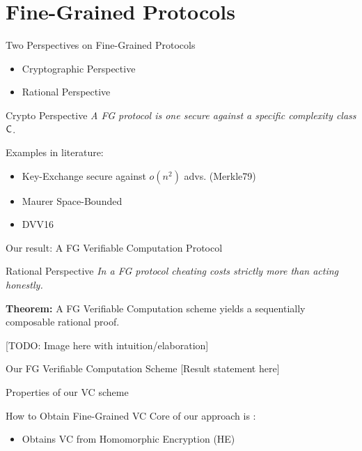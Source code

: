 \section{Fine-Grained Protocols}

\begin{frame}{Two Perspectives on Fine-Grained Protocols}
	
	\begin{itemize}
		\item Cryptographic Perspective
		\item  Rational Perspective
	\end{itemize}
\end{frame}

\begin{frame}{Crypto Perspective}
	\textit{A FG protocol is one secure against a specific complexity class ${\mathsf{C}}$}.\pause
	
	Examples in literature:
	\begin{itemize}
		\item Key-Exchange secure against $o(n^2)$ advs. (Merkle79)
		\item Maurer Space-Bounded
		\item DVV16
	\end{itemize}\pause
	Our result: A FG Verifiable Computation Protocol
\end{frame}

\begin{frame}{Rational Perspective}
\textit{In a FG protocol cheating costs strictly more than acting honestly.}\pause

\textbf{Theorem:} A FG Verifiable Computation scheme yields a sequentially composable rational proof.

[TODO: Image here with intuition/elaboration]
\end{frame}

\begin{frame}{Our FG Verifiable Computation Scheme}
	[Result statement here]
\end{frame}

\begin{frame}{Properties of our VC scheme}
\end{frame}

\begin{frame}{How to Obtain Fine-Grained VC}
	Core of our approach is \cite{ckv10}:
	\begin{itemize}
		\item  Obtains VC from Homomorphic Encryption (HE)
	\end{itemize}
\end{frame}

